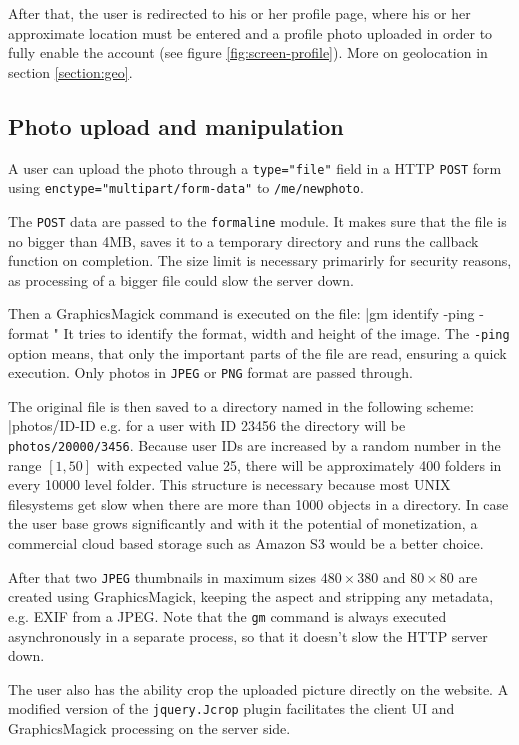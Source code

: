 \documentclass[12pt,oneside]{fithesis}
\begin{document}
	  After that, the user is redirected to his or her profile page, where his or her approximate location must be entered and a profile photo uploaded in order to fully enable the account (see figure \ref{fig:screen-profile}). More on geolocation in section \ref{section:geo}.
	\subsection{Photo upload and manipulation}
		A user can upload the photo through a \texttt{type="file"} field in a HTTP \texttt{POST} form using \texttt{enctype="multipart/form-data"} to \texttt{/me/newphoto}.
		
		The \texttt{POST} data are passed to the \texttt{formaline} module. It makes sure that the file is no bigger than 4MB, saves it to a temporary directory and runs the callback function on completion. The size limit is necessary primarirly for security reasons, as processing of a bigger file could slow the server down.
		
		Then a GraphicsMagick command is executed on the file:
		|gm identify -ping -format "%
		It tries to identify the format, width and height of the image. The \texttt{-ping} option means, that only the important parts of the file are read, ensuring a quick execution. Only photos in \texttt{JPEG} or \texttt{PNG} format are passed through.
		
		The original file is then saved to a directory named in the following scheme: 
		|photos/ID-ID%
		e.g. for a user with ID 23456 the directory will be \texttt{photos/20000/3456}. Because user IDs are increased by a random number in the range $\left[1,50\right]$ with expected value 25, there will be approximately 400 folders in every 10000 level folder. This structure is necessary because most UNIX filesystems get slow when there are more than 1000 objects in a directory. In case the user base grows significantly and with it the potential of monetization, a commercial cloud based storage such as Amazon S3 would be a better choice.
		
		After that two \texttt{JPEG} thumbnails in maximum sizes $480\times 380$ and $80\times 80$ are created using GraphicsMagick, keeping the aspect and stripping any metadata, e.g. EXIF from a JPEG. Note that the \texttt{gm} command is always executed asynchronously in a separate process, so that it doesn't slow the HTTP server down.
		
		The user also has the ability crop the uploaded picture directly on the website. A modified version of the \texttt{jquery.Jcrop} plugin facilitates the client UI and GraphicsMagick processing on the server side.
		
\end{document}
